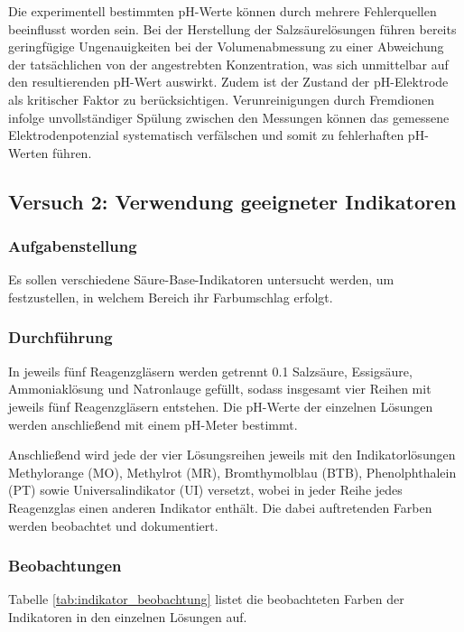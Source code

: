 Die experimentell bestimmten pH-Werte können durch mehrere Fehlerquellen beeinflusst worden sein. Bei der Herstellung der Salzsäurelösungen führen bereits geringfügige Ungenauigkeiten bei der Volumenabmessung zu einer Abweichung der tatsächlichen von der angestrebten Konzentration, was sich unmittelbar auf den resultierenden pH-Wert auswirkt. Zudem ist der Zustand der pH-Elektrode als kritischer Faktor zu berücksichtigen. Verunreinigungen durch Fremdionen infolge unvollständiger Spülung zwischen den Messungen können das gemessene Elektrodenpotenzial systematisch verfälschen und somit zu fehlerhaften pH-Werten führen.


\subsection{Versuch 2: Verwendung geeigneter Indikatoren}
\subsubsection{Aufgabenstellung}
Es sollen verschiedene Säure-Base-Indikatoren untersucht werden, um festzustellen, in welchem Bereich ihr Farbumschlag erfolgt.

\subsubsection{Durchführung}
In jeweils fünf Reagenzgläsern werden getrennt \SI{0,1}{} Salzsäure, Essigsäure, Ammoniaklösung und Natronlauge gefüllt, sodass insgesamt vier Reihen mit jeweils fünf Reagenzgläsern entstehen. Die pH-Werte der einzelnen Lösungen werden anschließend mit einem pH-Meter bestimmt.

Anschließend wird jede der vier Lösungsreihen jeweils mit den Indikatorlösungen Methylorange (MO), Methylrot (MR), Bromthymolblau (BTB), Phenolphthalein (PT) sowie Universalindikator (UI) versetzt, wobei in jeder Reihe jedes Reagenzglas einen anderen Indikator enthält. Die dabei auftretenden Farben werden beobachtet und dokumentiert.

\subsubsection{Beobachtungen}
Tabelle \ref{tab:indikator_beobachtung} listet die beobachteten Farben der Indikatoren in den einzelnen Lösungen auf.

